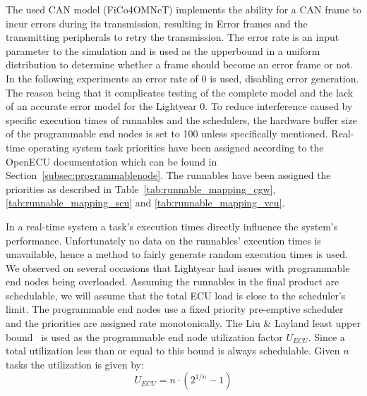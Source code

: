 The used CAN model (FiCo4OMNeT) implements the ability for a CAN frame to incur errors during its transmission, resulting in Error frames and the transmitting peripherals to retry the transmission. The error rate is an input parameter to the simulation and is used as the upperbound in a uniform distribution to determine whether a frame should become an error frame or not. In the following experiments an error rate of 0 is used, disabling error generation. The reason being that it complicates testing of the complete model and the lack of an accurate error model for the Lightyear 0. To reduce interference caused by specific execution times of runnables and the schedulers, the hardware buffer size of the programmable end nodes is set to 100 unless specifically mentioned. Real-time operating system task priorities have been assigned according to the OpenECU documentation which can be found in Section~\ref{subsec:programmablenode}. The runnables have been assigned the priorities as described in Table~\ref{tab:runnable_mapping_cgw},\ref{tab:runnable_mapping_scu} and \ref{tab:runnable_mapping_vcu}. 

In a real-time system a task's execution times directly influence the system's performance. Unfortunately no data on the runnables' execution times is unavailable, hence a method to fairly generate random execution times is used. We observed on several occasions that Lightyear had issues with programmable end nodes being overloaded. Assuming the runnables in the final product are schedulable, we will assume that the total ECU load is close to the scheduler's limit. The programmable end nodes use a fixed priority pre-emptive scheduler and the priorities are assigned rate monotonically. The Liu \& Layland least upper bound~\cite{liu1973scheduling} is used as the programmable end node utilization factor $U_{ECU}$. Since a total utilization less than or equal to this bound is always schedulable. Given $n$ tasks the utilization is given by:
\begin{equation}
    U_{ECU} = n \cdot (2^{1/n} -1)
\end{equation}

